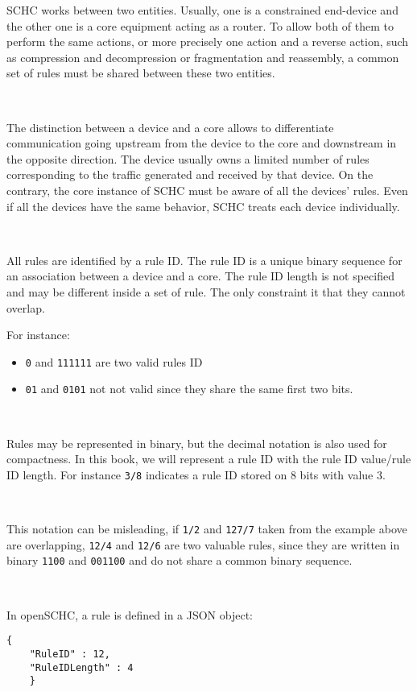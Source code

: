 \documentclass[onecolumn,12pt]{book}
\newcounter{c}
\begin{document}
SCHC  works between two entities. Usually, one is a constrained end-device and the other one is a core equipment acting as a router. To allow both of them to perform the same actions, or more precisely one action and a reverse action, such as compression and decompression or fragmentation and reassembly, a common set of rules must be shared between these two entities.

~

The distinction between a device and a core allows to differentiate communication going upstream from the device to the core and downstream in the opposite direction. The device usually owns a limited number of rules corresponding to the traffic  generated and received by that device. On the contrary, the core instance of SCHC must be aware of all the devices' rules. Even if all the devices have the same behavior, SCHC treats each device individually. 

~~

All rules are identified by a rule ID. The rule ID is a unique binary sequence for an association between a device and a core. The rule ID length is not specified and may be different inside a set of rule. The only constraint it that they cannot overlap.

For instance:


\begin{itemize}
\item\texttt{0} and \texttt{111111} are two valid rules ID
\item \texttt{01} and \texttt{0101} not not valid since they share the same first two bits.
\end{itemize}

~


Rules may be represented in binary, but the decimal notation is also used for compactness. In this book, we will represent a rule ID with the rule ID value/rule ID length. For instance \texttt{3/8} indicates a rule ID stored on 8 bits with value 3.

~

This notation can be misleading, if \texttt{1/2} and \texttt{127/7} taken from the example above are overlapping, \texttt{12/4} and \texttt{12/6} are two valuable rules, since they are written in binary \texttt{1100} and \texttt{001100} and do not share a common binary sequence.

~~~

In openSCHC, a rule is defined in a JSON object:

\begin{lstlisting}[backgroundcolor=\color{yellow}]
    {
    "RuleID" : 12,
    "RuleIDLength" : 4
    }
\end{lstlisting}
\end{document}
